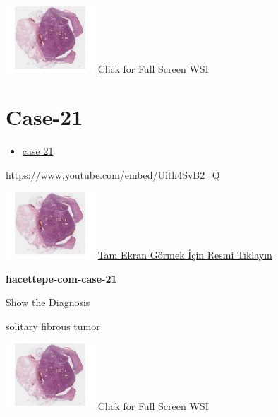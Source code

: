 \documentclass[
  letterpaper,
  paper=6in:9in,
  pagesize=pdftex,
  headinclude=on,
  footinclude=on,
  12pt]{scrbook}
\providecommand{\tightlist}{%
  \setlength{\itemsep}{0pt}\setlength{\parskip}{0pt}}\usepackage{longtable,booktabs,array}
\begin{document}
\href{https://images.patolojiatlasi.com/hacettepe-com-case-1/HE.html}{\includegraphics[width=0.25\textwidth,height=\textheight]{./screenshots/hacettepe-com-case-1_screenshot.png}}
\href{https://images.patolojiatlasi.com/hacettepe-com-case-/HE.html}{Click
for Full Screen WSI}

\hypertarget{sec-hacettepe-case-of-the-month-case-21}{%
\section{Case-21}\label{sec-hacettepe-case-of-the-month-case-21}}

\begin{itemize}
\tightlist
\item
  \href{https://www.youtube.com/watch?v=Uith4SvB2_Q\&ab_channel=KemalKosemehmetoglu}{case
  21}
\end{itemize}

\url{https://www.youtube.com/embed/Uith4SvB2_Q}

\href{https://images.patolojiatlasi.com/hacettepe-com-case-1/HE.html}{\includegraphics[width=0.25\textwidth,height=\textheight]{./screenshots/hacettepe-com-case-1_screenshot.png}}
\href{https://images.patolojiatlasi.com/hacettepe-com-case-21/HE.html}{Tam
Ekran Görmek İçin Resmi Tıklayın}

\textbf{hacettepe-com-case-21}

Show the Diagnosis

\hypertarget{answer21}{}
solitary fibrous tumor

\href{https://images.patolojiatlasi.com/hacettepe-com-case-1/HE.html}{\includegraphics[width=0.25\textwidth,height=\textheight]{./screenshots/hacettepe-com-case-1_screenshot.png}}
\href{https://images.patolojiatlasi.com/hacettepe-com-case-21/HE.html}{Click
for Full Screen WSI}
\end{document}
